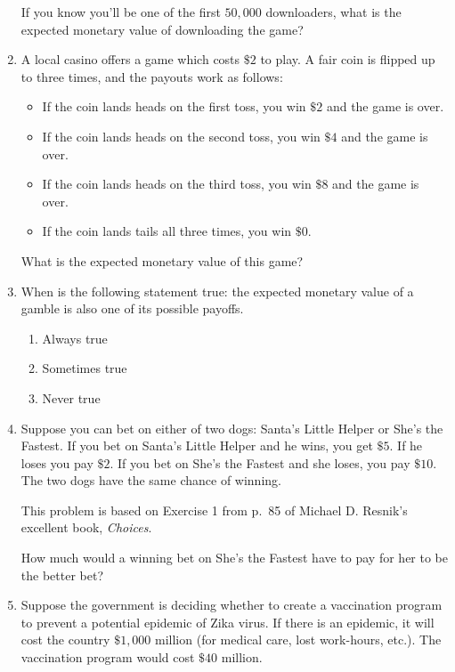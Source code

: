 \documentclass[justified]{tufte-book}
\providecommand{\tightlist}{%
  \setlength{\itemsep}{0pt}\setlength{\parskip}{0pt}}
\theoremstyle{definition}
\theoremstyle{definition}
\theoremstyle{definition}
\theoremstyle{remark}
\begin{document}
\begin{enumerate}
  If you know you'll be one of the first \(50,000\) downloaders, what is
  the expected monetary value of downloading the game?
\item
  A local casino offers a game which costs \(\$2\) to play. A fair coin
  is flipped up to three times, and the payouts work as follows:

  \begin{itemize}
  \tightlist
  \item
    If the coin lands heads on the first toss, you win \(\$2\) and the
    game is over.
  \item
    If the coin lands heads on the second toss, you win \(\$4\) and the
    game is over.
  \item
    If the coin lands heads on the third toss, you win \(\$8\) and the
    game is over.
  \item
    If the coin lands tails all three times, you win \(\$0\).
  \end{itemize}

  What is the expected monetary value of this game?
\item
  When is the following statement true: the expected monetary value of a
  gamble is also one of its possible payoffs.

  \begin{enumerate}
  \def\labelenumii{\alph{enumii}.}
  \tightlist
  \item
    Always true
  \item
    Sometimes true
  \item
    Never true
  \end{enumerate}
\item
  Suppose you can bet on either of two dogs: Santa's Little Helper or
  She's the Fastest. If you bet on Santa's Little Helper and he wins,
  you get \(\$5\). If he loses you pay \(\$2\). If you bet on She's the
  Fastest and she loses, you pay \(\$10\). The two dogs have the same
  chance of winning.

  \begin{marginfigure}
  This problem is based on Exercise 1 from p.~85 of Michael D. Resnik's
  excellent book, \emph{Choices}.
  \end{marginfigure}

  How much would a winning bet on She's the Fastest have to pay for her
  to be the better bet?
\item
  Suppose the government is deciding whether to create a vaccination
  program to prevent a potential epidemic of Zika virus. If there is an
  epidemic, it will cost the country \(\$1,000\) million (for medical
  care, lost work-hours, etc.). The vaccination program would cost
  \(\$40\) million.


\end{enumerate}
\end{document}
